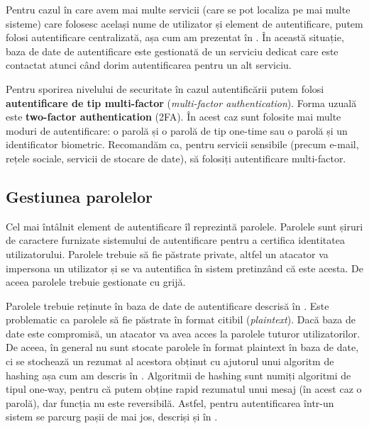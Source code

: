 Pentru cazul în care avem mai multe servicii (care se pot localiza pe mai multe sisteme) care folosesc același nume de utilizator și element de autentificare, putem folosi autentificare centralizată, așa cum am prezentat în . În această situație, baza de date de autentificare este gestionată de un serviciu dedicat care este contactat atunci când dorim autentificarea pentru un alt serviciu.

Pentru sporirea nivelului de securitate în cazul autentificării putem folosi \textbf{autentificare de tip multi-factor} (\textit{multi-factor authentication}). Forma uzuală este \textbf{two-factor authentication} (2FA). În acest caz sunt folosite mai multe moduri de autentificare: o parolă și o parolă de tip one-time sau o parolă și un identificator biometric. Recomandăm ca, pentru servicii sensibile (precum e-mail, rețele sociale, servicii de stocare de date), să folosiți autentificare multi-factor.

\subsection{Gestiunea parolelor}
\label{sec:sec:auth:password}

Cel mai întâlnit element de autentificare îl reprezintă parolele. Parolele sunt șiruri de caractere furnizate sistemului de autentificare pentru a certifica identitatea utilizatorului. Parolele trebuie să fie păstrate private, altfel un atacator va impersona un utilizator și se va autentifica în sistem pretinzând că este acesta. De aceea parolele trebuie gestionate cu grijă.

Parolele trebuie reținute în baza de date de autentificare descrisă în . Este problematic ca parolele să fie păstrate în format citibil (\textit{plaintext}). Dacă baza de date este compromisă, un atacator va avea acces la parolele tuturor utilizatorilor. De aceea, în general nu sunt stocate parolele în format plaintext în baza de date, ci se stochează un rezumat al acestora obținut cu ajutorul unui algoritm de hashing așa cum am descris în . Algoritmii de hashing sunt numiți algoritmi de tipul one-way, pentru că putem obține rapid rezumatul unui mesaj (în acest caz o parolă), dar funcția nu este reversibilă. Astfel, pentru autentificarea într-un sistem se parcurg pașii de mai jos, descriși și în .

